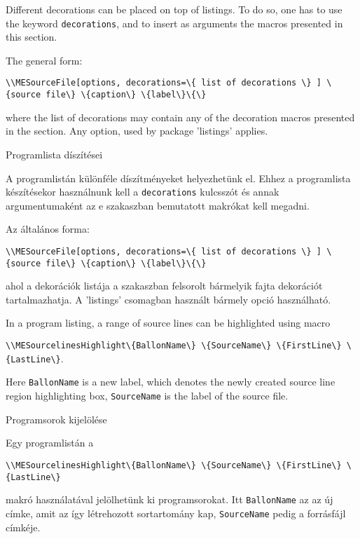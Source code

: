 {
Different decorations can be placed on top of listings.
To do so, one has to use the keyword  \lstinline|decorations|,
and to insert as arguments the macros presented in this section.

The general form:
\par\noindent\lstinline|\\MESourceFile[options,
decorations=\{
list of decorations
\}
] \{source file\} \{caption\} \{label\}\{\}|
\par\noindent where the list of decorations may contain any of the 
decoration macros presented in the section.
Any option, used by package 'listings' applies.
}
{Programlista díszítései}
{
A programlistán különféle díszítményeket helyezhetünk el.
Ehhez a programlista készítésekor használnunk kell a \lstinline|decorations| kulcsszót
és annak argumentumaként az e szakaszban bemutatott makrókat kell megadni.

Az általános forma:
\par\noindent\lstinline|\\MESourceFile[options,
decorations=\{
list of decorations
\}
] \{source file\} \{caption\} \{label\}\{\}|
\par\noindent ahol a dekorációk listája a szakaszban felsorolt 
bármelyik fajta dekorációt tartalmazhatja.
A 'listings' csomagban használt bármely opció használható.
}


{
In a program listing, a range of source lines can be highlighted using macro 
\par\noindent\lstinline|\\MESourcelinesHighlight\{BallonName\} \{SourceName\} \{FirstLine\} \{LastLine\}|.
\par\noindent Here  \lstinline|BallonName| is a new label, which denotes the 
newly created source line region highlighting box, \lstinline|SourceName| 
is the label of the source file. 
}
{Programsorok kijelölése}
{
Egy programlistán a
\par\noindent\lstinline|\\MESourcelinesHighlight\{BallonName\} \{SourceName\} \{FirstLine\} \{LastLine\}|
\par\noindent makró használatával jelölhetünk ki programsorokat. Itt \lstinline|BallonName|
az az új címke, amit az így létrehozott sortartomány kap, \lstinline|SourceName| pedig a
forrásfájl címkéje. 
}

